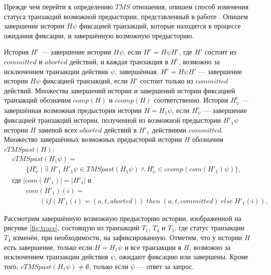 Прежде чем перейти к определению $TMS$ отношения, опишем способ изменения статуса транзакций возможной предыстории, представленный в работе \cite{tms_article}. Опишем завершение истории $H\psi$ фиксацией транзакций, которые находятся в процессе ожидания фиксации, и завершённую возможную предысторию.
\begin{mydefinition}\label{suff_comm_compl}
История $H^c$ --- завершение истории $H\psi$, если $H^c = H\psi{H'}$, где $H'$ состоит из $committed$ и $aborted$ действий, и каждая транзакция в $H^c$, возможно за исключением транзакции действия $\psi$, завершённая. $H^c = H\psi{H'}$ --- завершение истории $H\psi$ фиксацией транзакций, если $H'$ состоит только из $committed$ действий. Множества завершений истории и завершений истории фиксацией транзакций обозначим $comp(H)$ и $ccomp(H)$ соответственно.
История $H^c_{\psi}$ --- завершённая возможная предыстория истории $H = H_1\psi$, если $H^c_{\psi}$ --- завершение фиксацией транзакций истории, полученной из возможной предыстории $H'_1\psi$ истории $H$ заменой всех $aborted$ действий в $H'_1$ действиями $committed$. Множество завершённых возможных предысторий истории $H$ обозначим $cTMSpast(H)$: 
\begin{align*}
&cTMSpast(H_1\psi) = \\
&\qquad \{H^c_{\psi} \; | \; \exists \; H'_1  \; H'_1\psi \in TMSpast(H_1\psi) \land 
H^c_{\psi} \in ccomp(com(H'_1)\psi) \}, \\
&\text{где} \; |com(H'_1)| = |H'_1| \; \text{и} \\
& \qquad com(H'_1)(i) = \\
&\qquad \qquad (if \left (H'_1(i) = (a, t, aborted)\right)\; then \; (a, t, committed) \; else \; H'_1(i)).
\end{align*}
\end{mydefinition}

Рассмотрим завершённую возможную предысторию истории, изображенной на рисунке \ref{fig:trace}, состоящую из транзакций $T_1$, $T_4$ и $T_5$, где статус транзакции $T_4$ изменён, при необходимости, на зафиксированную. Отметим, что у истории $H$ есть завершение, только если $H = H_1\psi$ и все транзакции в $H$, возможно за исключением транзакции действия $\psi$, ожидают фиксацию или завершены. Кроме того, $cTMSpast(H_1\psi) \neq \emptyset$, только если $\psi$ --- ответ за запрос.

